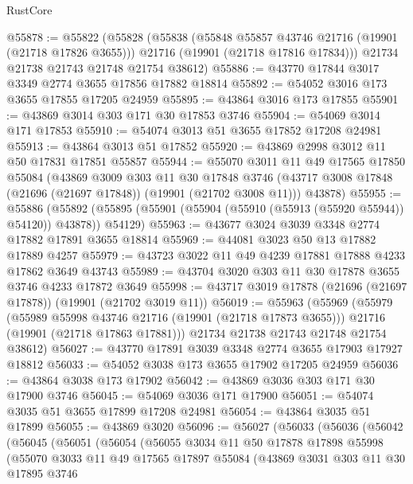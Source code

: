\begin{lexlean}{RustCore}
\begin{coremodule}
@55878 := @55822
    (@55828
      (@55838
        (@55848 @55857 @43746 @21716 (@19901 (@21718 @17826 @3655)))
        @21716
        (@19901 (@21718 @17816 @17834)))
      @21734
      @21738
      @21743
      @21748
      @21754
      @38612)
@55886 := @43770 @17844 @3017 @3349 @2774 @3655 @17856 @17882 @18814
@55892 := @54052 @3016 @173 @3655 @17855 @17205 @24959
@55895 := @43864 @3016 @173 @17855
@55901 := @43869 @3014 @303 @171 @30 @17853 @3746
@55904 := @54069 @3014 @171 @17853
@55910 := @54074 @3013 @51 @3655 @17852 @17208 @24981
@55913 := @43864 @3013 @51 @17852
@55920 := @43869 @2998 @3012 @11 @50 @17831 @17851 @55857
@55944 := @55070
    @3011
    @11
    @49
    @17565
    @17850
    @55084
    (@43869
      @3009
      @303
      @11
      @30
      @17848
      @3746
      (@43717 @3008 @17848 (@21696 (@21697 @17848)) (@19901 (@21702 @3008 @11)))
      @43878)
@55955 := @55886
    (@55892 (@55895 (@55901 (@55904 (@55910 (@55913 (@55920 @55944)) @54120)) @43878)) @54129)
@55963 := @43677 @3024 @3039 @3348 @2774 @17882 @17891 @3655 @18814
@55969 := @44081 @3023 @50 @13 @17882 @17889 @4257
@55979 := @43723 @3022 @11 @49 @4239 @17881 @17888 @4233 @17862 @3649 @43743
@55989 := @43704 @3020 @303 @11 @30 @17878 @3655 @3746 @4233 @17872 @3649
@55998 := @43717 @3019 @17878 (@21696 (@21697 @17878)) (@19901 (@21702 @3019 @11))
@56019 := @55963
    (@55969
      (@55979
        (@55989 @55998 @43746 @21716 (@19901 (@21718 @17873 @3655)))
        @21716
        (@19901 (@21718 @17863 @17881)))
      @21734
      @21738
      @21743
      @21748
      @21754
      @38612)
@56027 := @43770 @17891 @3039 @3348 @2774 @3655 @17903 @17927 @18812
@56033 := @54052 @3038 @173 @3655 @17902 @17205 @24959
@56036 := @43864 @3038 @173 @17902
@56042 := @43869 @3036 @303 @171 @30 @17900 @3746
@56045 := @54069 @3036 @171 @17900
@56051 := @54074 @3035 @51 @3655 @17899 @17208 @24981
@56054 := @43864 @3035 @51 @17899
@56055 := @43869 @3020
@56096 := @56027
    (@56033
      (@56036
        (@56042
          (@56045
            (@56051
              (@56054
                (@56055
                  @3034
                  @11
                  @50
                  @17878
                  @17898
                  @55998
                  (@55070
                    @3033
                    @11
                    @49
                    @17565
                    @17897
                    @55084
                    (@43869
                      @3031
                      @303
                      @11
                      @30
                      @17895
                      @3746

\end{coremodule}
\end{lexlean}
